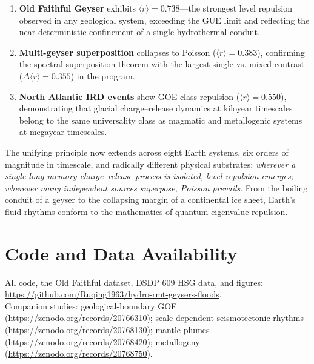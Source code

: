 \documentclass[12pt,a4paper]{article}
\begin{document}
\begin{enumerate}
\item \textbf{Old Faithful Geyser} exhibits $\langle r\rangle=0.738$---the strongest level repulsion observed in any geological system, exceeding the GUE limit and reflecting the near-deterministic confinement of a single hydrothermal conduit.
\item \textbf{Multi-geyser superposition} collapses to Poisson ($\langle r\rangle=0.383$), confirming the spectral superposition theorem with the largest single-vs.-mixed contrast ($\Delta\langle r\rangle=0.355$) in the program.
\item \textbf{North Atlantic IRD events} show GOE-class repulsion ($\langle r\rangle=0.550$), demonstrating that glacial charge--release dynamics at kiloyear timescales belong to the same universality class as magmatic and metallogenic systems at megayear timescales.
\end{enumerate}

The unifying principle now extends across eight Earth systems, six orders of magnitude in timescale, and radically different physical substrates: \emph{wherever a single long-memory charge--release process is isolated, level repulsion emerges; wherever many independent sources superpose, Poisson prevails}. From the boiling conduit of a geyser to the collapsing margin of a continental ice sheet, Earth's fluid rhythms conform to the mathematics of quantum eigenvalue repulsion.

\section*{Code and Data Availability}
All code, the Old Faithful dataset, DSDP 609 HSG data, and figures: \url{https://github.com/Ruqing1963/hydro-rmt-geysers-floods}.\\
Companion studies: geological-boundary GOE (\url{https://zenodo.org/records/20766310}); scale-dependent seismotectonic rhythms (\url{https://zenodo.org/records/20768130}); mantle plumes (\url{https://zenodo.org/records/20768420}); metallogeny (\url{https://zenodo.org/records/20768750}).
\end{document}
